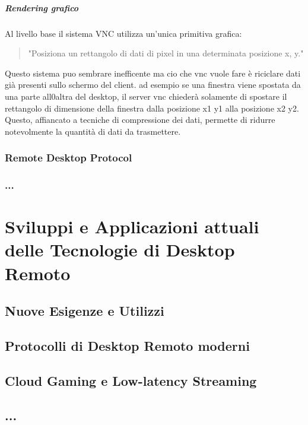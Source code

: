 \documentclass[12pt,a4paper,openright,twoside]{book}
\begin{document}
\paragraph{Rendering grafico}
Al livello base il sistema VNC utilizza un'unica primitiva grafica:
\begin{quote}
    "Posiziona un rettangolo di dati di pixel in una determinata posizione x, y."
\end{quote}

Questo sistema puo sembrare inefficente ma cio che vnc vuole fare è riciclare dati già presenti sullo schermo del client. ad esempio se una finestra viene spostata da una parte all0altra del desktop, il server vnc chiederà solamente di spostare il rettangolo di dimensione della finestra dalla posizione x1 y1 alla posizione x2 y2. Questo, affiancato a tecniche di compressione dei dati, permette di ridurre notevolmente la quantità di dati da trasmettere.

\subsection{Remote Desktop Protocol}

\subsection{...}

\chapter{Sviluppi e Applicazioni attuali delle Tecnologie di Desktop Remoto}

\section{Nuove Esigenze e Utilizzi}

\section{Protocolli di Desktop Remoto moderni}

\section{Cloud Gaming e Low-latency Streaming}

\section{...}
\end{document}
